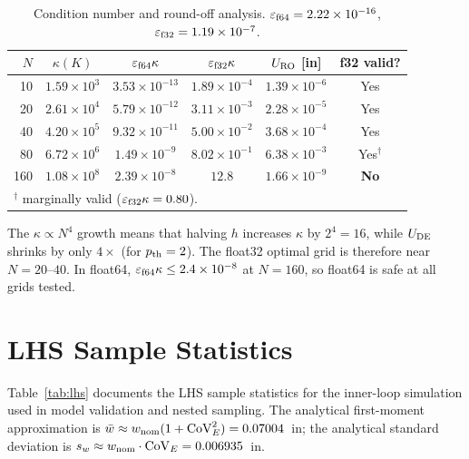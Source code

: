 \documentclass[10pt,twocolumn]{article}
\begin{document}
\begin{table}[h!]
\centering
\caption{Condition number and round-off analysis.
  $\varepsilon_{\rm f64}=2.22\times10^{-16}$,
  $\varepsilon_{\rm f32}=1.19\times10^{-7}$.}
\label{tab:roundoff}
\footnotesize
\setlength{\tabcolsep}{2pt}
\begin{tabular}{@{}rccccc@{}}
\toprule
$N$ & $\kappa(K)$ & $\varepsilon_{\rm f64}\kappa$ & $\varepsilon_{\rm f32}\kappa$ &
  $U_{\rm RO}$ [in] & f32 valid?\\
\midrule
 10 & $1.59{\times}10^{3}$ & $3.53{\times}10^{-13}$ & $1.89{\times}10^{-4}$ & $1.39{\times}10^{-6}$ & Yes\\
 20 & $2.61{\times}10^{4}$ & $5.79{\times}10^{-12}$ & $3.11{\times}10^{-3}$ & $2.28{\times}10^{-5}$ & Yes\\
 40 & $4.20{\times}10^{5}$ & $9.32{\times}10^{-11}$ & $5.00{\times}10^{-2}$ & $3.68{\times}10^{-4}$ & Yes\\
 80 & $6.72{\times}10^{6}$ & $1.49{\times}10^{-9}$  & $8.02{\times}10^{-1}$ & $6.38{\times}10^{-3}$ & Yes$^\dagger$\\
160 & $1.08{\times}10^{8}$ & $2.39{\times}10^{-8}$  & $12.8$                & $1.66{\times}10^{-9}$ & \textbf{No}\\
\bottomrule
\multicolumn{6}{l}{$^\dagger$ marginally valid ($\varepsilon_{\rm f32}\kappa=0.80$).}
\end{tabular}
\end{table}

The $\kappa\propto N^4$ growth means that halving $h$ increases $\kappa$ by
$2^4=16$, while $U_{\rm DE}$ shrinks by only $4\times$ (for $p_{\rm th}=2$).
The float32 optimal grid is therefore near $N=20$--$40$.
In float64, $\varepsilon_{\rm f64}\kappa\le2.4\times10^{-8}$ at $N=160$,
so float64 is safe at all grids tested.

\section{LHS Sample Statistics}
\label{app:lhs}

Table~\ref{tab:lhs} documents the LHS sample statistics for the
inner-loop simulation used in model validation and nested sampling.
The analytical first-moment approximation is
$\bar{w}\approx w_{\rm nom}(1+{\rm CoV}_E^2)=0.07004$~in;
the analytical standard deviation is
$s_w\approx w_{\rm nom}\cdot{\rm CoV}_E=0.006935$~in.
\end{document}
